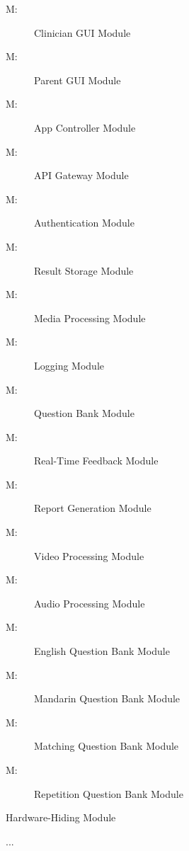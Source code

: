 \documentclass[12pt, titlepage]{article}
\newcounter{mnum}
\newcommand{\mthemnum}{M\themnum}
\begin{document}
\begin{multicols}{2}
  \begin{description}
    \item [ \mthemnum \label{mClinicianGUI}:] Clinician GUI Module
    \item [ \mthemnum \label{mParentGUI}:] Parent GUI Module
    \item [ \mthemnum \label{mAppController}:] App Controller Module
    \item [ \mthemnum \label{mAPIGateway}:] API Gateway Module
    \item [ \mthemnum \label{mAuth}:] Authentication Module
    \item [ \mthemnum \label{mResultStorage}:] Result Storage Module
    \item [ \mthemnum \label{mMediaProcessing}:] Media Processing Module
    \item [ \mthemnum \label{mLogging}:] Logging Module
    \item [ \mthemnum \label{mQuestionBank}:] Question Bank Module
    \item [ \mthemnum \label{mRealTimeFeedback}:] Real-Time Feedback Module
    \item [ \mthemnum \label{mReportGeneration}:] Report Generation Module
    \item [ \mthemnum \label{mVideoProcessing}:] Video Processing Module
    \item [ \mthemnum \label{mAudioProcessing}:] Audio Processing Module
    \item [ \mthemnum \label{mEnglishBank}:] English Question Bank Module
    \item [ \mthemnum \label{mMandarinBank}:] Mandarin Question Bank Module
    \item [ \mthemnum \label{mMatchingBank1}:] Matching Question Bank Module 
    \item [ \mthemnum \label{mRepetitionBank1}:] Repetition Question Bank Module
  \end{description}
  \end{multicols}

\begin{description}
\item [ \mthemnum \label{mHH}:] Hardware-Hiding Module
\item ...
\end{description}
\end{document}
